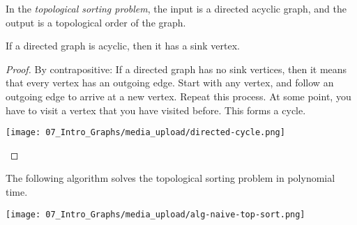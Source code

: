 \begin{definition}
\label{def:intro-to-graph-theory::topological-sorting-problem}
In the \emph{topological sorting problem}, the input is a directed acyclic graph, and the output is a topological order of the graph.

\end{definition}

\begin{flex}
\label{grp:lem:intro-to-graph-theory::acyclic-directed-graph-has-a-sink}

\begin{lemma}
\label{lem:intro-to-graph-theory::acyclic-directed-graph-has-a-sink}
If a directed graph is acyclic, then it has a sink vertex.

\end{lemma}

\begin{proof}
\label{prf:intro-to-graph-theory::contrapositive}
By contrapositive: If a directed graph has no sink vertices, then it means that every vertex has an outgoing edge. Start with any vertex, and follow an outgoing edge to arrive at a new vertex. Repeat this process. At some point, you have to visit a vertex that you have visited before. This forms a cycle.
\begin{center}
    \texttt{[image: 07\_Intro\_Graphs/media\_upload/directed-cycle.png]}
\end{center}

\end{proof}
\end{flex}

\begin{note}
\label{nt:intro-to-graph-theory::topological-sort---na-i-ve-algorithm}
The following algorithm solves the topological sorting problem in polynomial time.
\begin{center}
    \texttt{[image: 07\_Intro\_Graphs/media\_upload/alg-naive-top-sort.png]}
\end{center}

\end{note}

